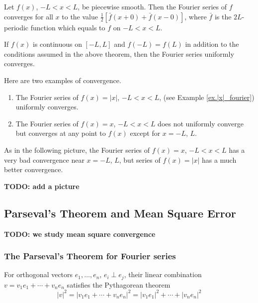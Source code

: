 \begin{theorem}
Let $f(x)$, $-L<x<L$, be piecewise smooth. Then the Fourier series of $f$ converges for all $x$ to the value $\frac{1}{2}[\bar{f}(x+0)+\bar{f}(x-0)]$, where $\bar{f}$ is the $2 L$-periodic function which equals to $f$ on $-L<x<L$.

If $f(x)$ is continuous on $[-L, L]$ and $f(-L)=f(L)$ in addition to the conditions assumed in the above theorem, then the Fourier series uniformly converges.
\end{theorem}

\begin{example}[] Here are two examples of convergence.

    \begin{enumerate}
        \item The Fourier series of $f(x)=|x|$, $-L<x<L$, (see Example \ref{ex.|x|_fourier}) uniformly converges. 
        
        \item The Fourier series of $f(x)=x$, $-L<x<L$ does not uniformly converge but converges at any point to $f(x)$ except for $x = -L$, $L$. 
    \end{enumerate}

    As in the following picture, the Fourier series of $f(x)=x$, $-L<x<L$ has a very bad convergence near $x = -L$, $L$, but series of $f(x)=|x|$ has a much better convergence.

    \textbf{TODO: add a picture}
\end{example}

\subsection{Parseval's Theorem and Mean Square Error}

\textbf{TODO: we study mean square convergence}

\subsubsection{The Parseval's Theorem for Fourier series}

For orthogonal vectors $e_1,\dots, e_{n}$, $e_i\perp e_j$, their linear combination $v = v_1 e_1+\cdots+v_n e_n$ satisfies the Pythagorean theorem
\begin{equation}\label{eq.Pythagorean}
    |v|^2 = |v_1 e_1+\cdots+v_n e_n|^2 = |v_1 e_1|^2+\cdots+|v_n e_n|^2
\end{equation}

